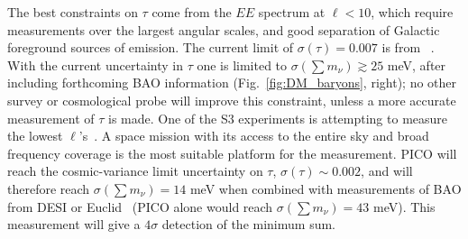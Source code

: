 \documentclass[PICOReport.tex]{subfiles}
\begin{document}
The best constraints on $\tau$ come from the $EE$ spectrum at $\ell < 10$, which require measurements over the largest angular scales, and good separation of Galactic foreground sources of emission. The current limit of $\sigma({\tau}) = 0.007$ is from \planck~\cite{planck2016_xlvi}.  
With the current uncertainty in $\tau$ one is limited to  $\sigma(\sum m_\nu) \gtrsim 25$ meV, after including forthcoming \ac{BAO} information (Fig.~\ref{fig:DM_baryons}, right); no other survey or cosmological probe will improve this constraint, unless a more accurate measurement of $\tau$ is made. One of the S3 experiments is attempting to measure the lowest $\ell$'s~\citep{class}. A space mission with its access to the entire sky and broad frequency coverage is the most suitable platform for the measurement. PICO will reach the cosmic-variance limit uncertainty on $\tau$, $\sigma(\tau) \sim 0.002$, and will therefore reach $\sigma(\sum m_\nu) = 14$ meV when combined with measurements of \ac{BAO} from DESI or Euclid~\cite{Levi:2013gra} (PICO alone would reach $\sigma(\sum m_\nu) = 43$ meV).  This measurement will give a $4\sigma$ detection of the minimum sum. 

\end{document}
